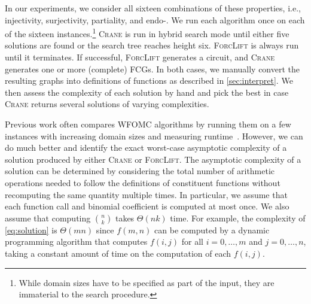 \documentclass{article}
\theoremstyle{definition}
\theoremstyle{remark}
\begin{document}
In our experiments, we consider all sixteen combinations of these properties,
i.e., injectivity, surjectivity, partiality, and endo-. We run each algorithm
once on each of the sixteen instances.\footnote{While domain sizes have to be
  specified as part of the input, they are immaterial to the search procedure.}
\textsc{Crane} is run in hybrid search mode until either five solutions are
found or the search tree reaches height six. \textsc{ForcLift} is always run
until it terminates. If successful, \textsc{ForcLift} generates a circuit, and
\textsc{Crane} generates one or more (complete) FCGs. In both cases, we manually
convert the resulting graphs into definitions of functions as described in
\cref{sec:interpret}. We then assess the complexity of each solution by hand and
pick the best in case \textsc{Crane} returns several solutions of varying
complexities.


Previous work often compares WFOMC algorithms by running them on a few instances
with increasing domain sizes and measuring
runtime~\cite{DBLP:conf/nips/Broeck11,DBLP:conf/ijcai/BroeckTMDR11,DBLP:conf/aaai/BroeckD12}.
However, we can do much better and identify the exact worst-case asymptotic
complexity of a solution produced by either \textsc{Crane} or \textsc{ForcLift}.
The asymptotic complexity of a solution can be determined by considering the
total number of arithmetic operations needed to follow the definitions of
constituent functions without recomputing the same quantity multiple times. In
particular, we assume that each function call and binomial coefficient is
computed at most once. We also assume that computing $\binom{n}{k}$ takes
$\Theta(nk)$ time. For example, the complexity of \cref{eq:solution} is
$\Theta(mn)$ since $f(m, n)$ can be computed by a dynamic programming algorithm
that computes $f(i, j)$ for all $i = 0, \dots, m$ and $j = 0, \dots, n$, taking
a constant amount of time on the computation of each $f(i, j)$.
\end{document}
